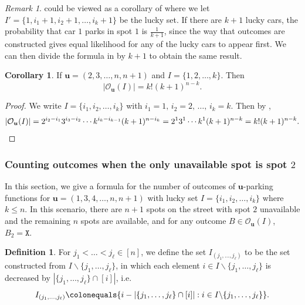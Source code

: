 \documentclass[reqno]{amsart}
\newcommand{\X}{\texttt{X}}
\theoremstyle{definition}
\newtheorem{corollary}{Corollary}[theorem]
\newtheorem{definition}[theorem]{Definition}
\theoremstyle{remark}
\newtheorem*{remark}{Remark}
\newcommand{\out}{\mathcal{O}}
\newcommand{\bsy}{\boldsymbol}
\begin{document}
\begin{remark}
 could be viewed as a corollary of  where we let $I' =\{ 1, i_1 +1, i_2 +1,\ldots, i_k+1\}$ be the lucky set. If there are $k+1$ lucky cars, the probability that car $1$ parks in spot $1$ is $\frac{1}{k+1}$, since {the way that outcomes are constructed gives equal likelihood for any of the lucky cars to appear first}.
We can then divide the formula in  by $k+1$ to obtain the same result.
\end{remark}



\begin{corollary}\label{cor:first k forbidden spot one}
If $\bsy{u} = (2,3,\ldots,n,  n+1)$ and $I = \{1,2,\ldots,k\}$. Then
\[
|\out_{\bsy u}(I)|=k! (k+1)^{n-k}.
\]
\end{corollary}

\begin{proof}
We write $I = \{i_1,i_2,\ldots, i_k\}$ with $i_1=1,\,i_2=2,\,\ldots,\, i_k=k$. Then by , \[|\out_{\bsy u}(I)| =2^{i_2-i_1}3^{i_3-i_2}\cdots k^{i_{k}-i_{k-1}} (k+1)^{n-i_k} = 2^{1}3^{1}\cdots k^{1} (k+1)^{n-k} = k! (k+1)^{n-k}.\qedhere\]

\end{proof}


\subsubsection{Counting outcomes when the only unavailable spot is spot $2$}\label{subsec: spot 2 is unavailable}
In this section, we give a formula for the number of outcomes of $\bsy{u}$-parking functions for $\bsy{u}=(1,3,4,\ldots, n,n+1)$ with lucky set $I=\{i_1,i_2,\ldots,i_k\}$ where $k\leq n$. In this scenario, there are $n+1$ spots on the street with spot $2$ unavailable and the remaining $n$ spots are available, and for any outcome $B\in \out_{\bsy{u}}(I)$, $B_2=\X$.

\begin{definition}
For $j_1 < \dots < j_\ell \in [n]$, we define the set $I_{(j_1,\dots, j_\ell)}$ to be the set constructed from $I \backslash \{j_1, \dots, j_\ell\}$, in which each element $i \in I \backslash \{j_1, \dots, j_\ell\}$ is decreased by $|\{j_1, \dots, j_\ell\} \cap [i]|$, i.e.
\[ I_{(j_1,\dots, j_\ell)} \colonequals \{i -  |\{j_1, \dots, j_\ell\} \cap [i]| : i \in I \backslash \{j_1, \dots, j_\ell\}\}.\]

\end{definition}
\end{document}
